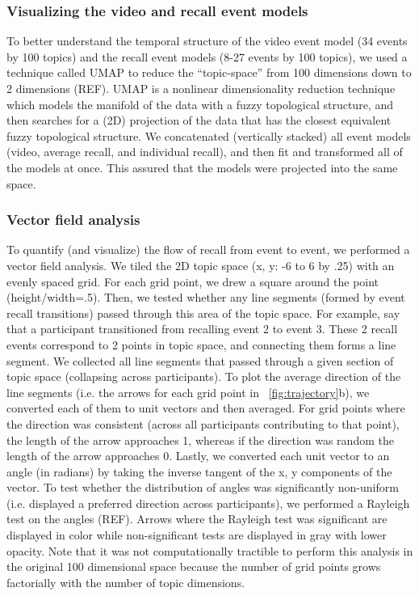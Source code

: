 \documentclass{article}
\begin{document}
{\subsubsection{Visualizing the video and recall event models}

To better understand the temporal structure of the video event model (34 events by 100 topics) and the recall event models (8-27 events by 100 topics), we used a technique called UMAP to reduce the ``topic-space'' from 100 dimensions down to 2 dimensions (REF). UMAP is a nonlinear dimensionality reduction technique which models the manifold of the data with a fuzzy topological structure, and then searches for a (2D) projection of the data that has the closest equivalent fuzzy topological structure. We concatenated (vertically stacked) all event models (video, average recall, and individual recall), and then fit and transformed all of the models at once. This assured that the models were projected into the same space.

\subsubsection{Vector field analysis}
To quantify (and visualize) the flow of recall from event to event, we performed a vector field analysis.  We tiled the 2D topic space (x, y: -6 to 6 by .25) with an evenly spaced grid. For each grid point, we drew a square around the point (height/width=.5). Then, we tested whether any line segments (formed by event recall transitions) passed through this area of the topic space.  For example, say that a participant transitioned from recalling event 2 to event 3. These 2 recall events correspond to 2 points in topic space, and connecting them forms a line segment. We collected all line segments that passed through a given section of topic space (collapsing across participants). To plot the average direction of the line segments (i.e. the arrows for each grid point in ~\ref{fig:trajectory}b), we converted each of them to unit vectors and then averaged. For grid points where the direction was consistent (across all participants contributing to that point), the length of the arrow approaches 1, whereas if the direction was random the length of the arrow approaches 0. Lastly, we converted each unit vector to an angle (in radians) by taking the inverse tangent of the x, y components of the vector. To test whether the distribution of angles was significantly non-uniform (i.e. displayed a preferred direction across participants), we performed a Rayleigh test on the angles (REF). Arrows where the Rayleigh test was significant are displayed in color while non-significant tests are displayed in gray with lower opacity. Note that it was not computationally tractible to perform this analysis in the original 100 dimensional space because the number of grid points grows factorially with the number of topic dimensions.

}
\end{document}
